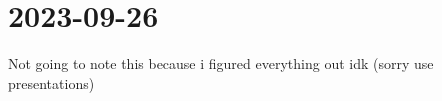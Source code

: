 \section{2023-09-26}

Not going to note this because i figured everything out idk (sorry use presentations)
